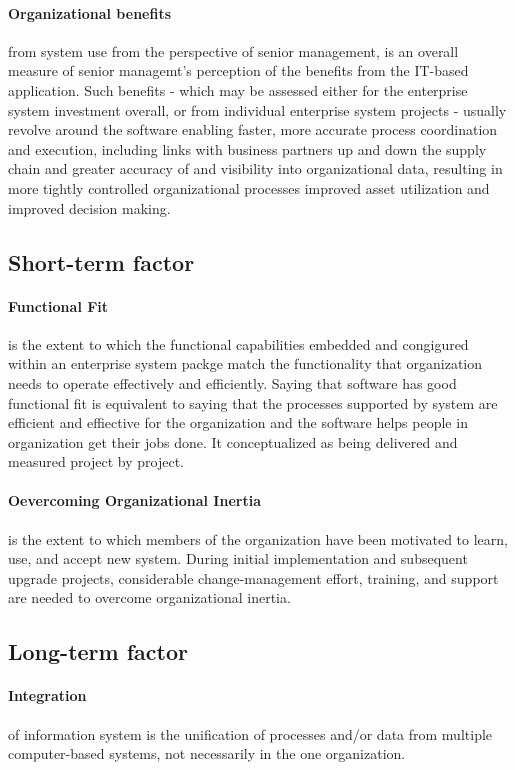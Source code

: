 \paragraph{Organizational benefits} from system use from the perspective of senior management, is an overall measure of senior managemt's perception of the benefits from the IT-based application. Such benefits - which may be assessed either for the enterprise system investment overall, or from individual enterprise system projects - usually revolve around the software enabling faster, more accurate process coordination and execution, including links with business partners up and down the supply chain and greater accuracy of and visibility into organizational data, resulting in more tightly controlled organizational processes improved asset utilization and improved decision making.

\subsection{Short-term factor}
\paragraph{Functional Fit} is the extent to which the functional capabilities embedded and congigured within an enterprise system packge match the functionality that organization needs to operate effectively and efficiently. Saying that software has good functional fit is equivalent to saying that the processes supported by system are efficient and effiective for the organization and the software helps people in organization get their jobs done. It conceptualized as being delivered and measured project by project.
\paragraph{Oevercoming Organizational Inertia} is the extent to which members of the organization have been motivated to learn, use, and accept new system. During initial implementation and subsequent upgrade projects, considerable change-management effort, training, and support are needed to overcome organizational inertia.

\subsection{Long-term factor}
\paragraph{Integration} of information system is the unification of processes and/or data from multiple computer-based systems, not necessarily in the one organization.

